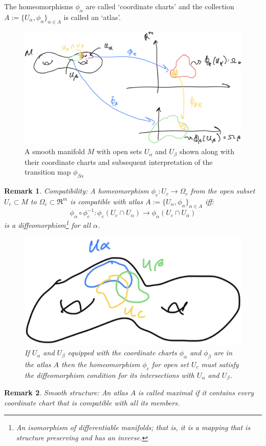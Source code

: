 \documentclass{article}
\newtheorem{remark}{Remark}
\begin{document}

The homeomorphisms $\phi_{\alpha}$ are called `coordinate charts' and the collection $A:= \{U_{\alpha}, \phi_{\alpha}\}_{\alpha \in A}$ is called an `atlas'.

\begin{figure}[hbt!]
    \centering
    \includegraphics[width=0.6\linewidth]{figures/coordinate_charts_1.PNG}
    \caption{A smooth manifold $M$ with open sets $U_{\alpha}$ and $U_{\beta}$ shown along with their coordinate charts and subsequent interpretation of the transition map $\phi_{\beta \alpha}$}
    \label{fig:coordinate_chart}
\end{figure}

\begin{remark}
        Compatibility: A homeomorphism $\phi_{c}: U_{c} \rightarrow \Omega_{c}$ from the open subset $U_{c}\subset M$ to $\Omega_{c}\subset \Re^{m}$ is compatible with atlas $A:=\{U_{\alpha}, \phi_{\alpha}\}_{\alpha \in A}$ iff: $$\phi_{\alpha}\circ \phi_{c}^{-1}: \phi_{c}(U_{c}\cap U_{\alpha}) \rightarrow \phi_{\alpha}(U_{c} \cap U_{\alpha})$$
        is a diffeomorphism\footnote{An isomorphism of differentiable manifolds; that is, it is a mapping that is structure preserving and has an inverse.} for all $\alpha$.
        \begin{figure}[hbt!]
            \centering
            \includegraphics[width=0.3\linewidth]{figures/compatiblity_atlas.PNG}
            \caption{If $U_{\alpha}$ and $U_{\beta}$ equipped with the coordinate charts $\phi_{\alpha}$ and $\phi_{\beta}$ are in the atlas $A$ then the homeomorphism $\phi_{c}$ for open set $U_{c}$ must satisfy the diffeomorphism condition for its intersections with $U_{\alpha}$ and $U_{\beta}$.}
            \label{fig:compatibility}
        \end{figure}
\end{remark}
\begin{remark}
        Smooth structure: An atlas $A$ is called maximal if it contains every coordinate chart that is compatible with all its members.
\end{remark}
\end{document}
